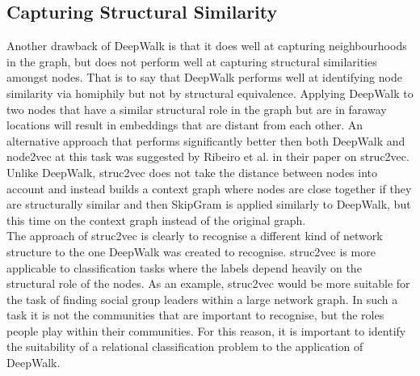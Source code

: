 \documentclass[a4paper]{article}
\begin{document}
\subsection{Capturing Structural Similarity}
Another drawback of DeepWalk is that it does well at capturing neighbourhoods in the graph, but does not perform well
at capturing structural similarities amongst nodes. That is to say that DeepWalk
performs well at identifying node similarity via homiphily but not by structural equivalence. Applying DeepWalk to two nodes
that have a similar structural role in the graph but are in faraway locations
will result in embeddings that are distant from each other. An alternative
approach that performs significantly better then both DeepWalk and node2vec at this task was suggested by
Ribeiro et al. in their paper on struc2vec\cite{ribeiro2017}. Unlike DeepWalk, struc2vec does not
take the distance between nodes into account and instead builds a context graph
where nodes are close together if they are structurally similar and then
SkipGram is applied similarly to DeepWalk, but this time on the
context graph instead of the original graph.\\
The approach of struc2vec is clearly to recognise a different kind of network
structure to the one DeepWalk was created to recognise. struc2vec is more
applicable to classification tasks where the labels depend heavily on the
structural role of the nodes. As an example, struc2vec would be more suitable
for the task of finding social group leaders within a large network
graph. In such a task it is not the communities that are important to recognise,
but the roles people play within their communities. For this reason, it is
important to identify the suitability of a relational classification problem to
the application of DeepWalk.
\end{document}
